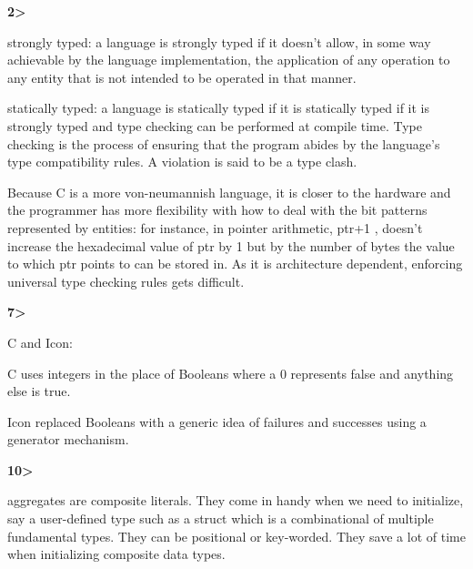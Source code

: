 \documentclass[12pt]{article}
\renewcommand{\_}{\kern-1.5pt\textunderscore\kern-1.5pt}
\begin{document}
\vspace{\baselineskip}

\vspace{\baselineskip}
\textbf{2>}\par

strongly typed: a language is strongly typed if it doesn't allow, in some way achievable by the language implementation, the application of any operation to any entity that is not intended to be operated in that manner.\par

statically typed: a language is statically typed if it is statically typed if it is strongly typed and type checking can be performed at compile time. Type checking is the process of ensuring that the program abides by the language's type compatibility rules. A violation is said to be a type clash.\par

Because C is a more von-neumannish language, it is closer to the hardware and the programmer has more flexibility with how to deal with the bit patterns represented by entities: for instance, in pointer arithmetic, ptr+1 , doesn't increase the hexadecimal value of ptr by 1 but by the number of bytes the value to which ptr points to can be stored in. As it is architecture dependent, enforcing universal type checking rules gets difficult.\par


\vspace{\baselineskip}
\textbf{7>}\par

C and Icon:\par

C uses integers in the place of Booleans where a 0 represents false and anything else is true.\par

Icon replaced Booleans with a generic idea of failures and successes using a generator mechanism. \par


\vspace{\baselineskip}
\textbf{10>}\par

aggregates are composite literals. They come in handy when we need to initialize, say a user-defined type such as a struct which is a combinational of multiple fundamental types. They can be positional or key-worded. They save a lot of time when initializing composite data types.\par
\end{document}
